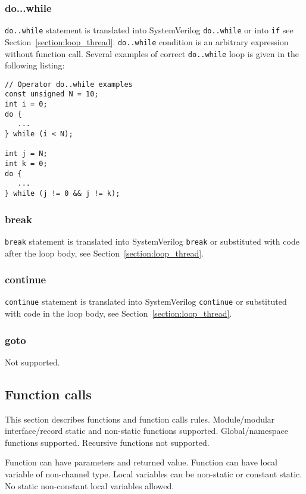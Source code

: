 \subsubsection{do...while}

{\tt do..while} statement is translated into SystemVerilog {\tt do..while} or into {\tt if} see Section~\ref{section:loop_thread}. 
{\tt do..while} condition is an arbitrary expression without function call.
Several examples of correct {\tt do..while} loop is given in the following listing:
%
\begin{lstlisting}[style=mycpp]
// Operator do..while examples
const unsigned N = 10;
int i = 0;
do {
   ...
} while (i < N);

int j = N;
int k = 0;
do {
   ...
} while (j != 0 && j != k);
\end{lstlisting}

\subsubsection{break}

{\tt break} statement is translated into SystemVerilog {\tt break} or substituted  with code after the loop body, see Section~\ref{section:loop_thread}. 

\subsubsection{continue}

{\tt continue} statement is translated into SystemVerilog {\tt continue} or substituted with code in the loop body, see Section~\ref{section:loop_thread}. 

\subsubsection{goto}

Not supported.

\subsection{Function calls}

This section describes functions and function calls rules. Module/modular interface/record static and non-static functions supported. Global/namespace functions supported. Recursive functions not supported.

Function can have parameters and returned value. Function can have local variable of non-channel type. Local variables can be non-static or constant static. No static non-constant local variables allowed.

